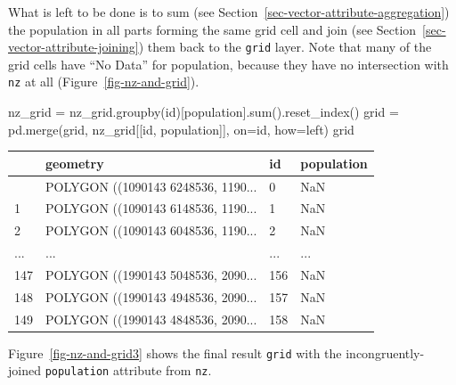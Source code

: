\documentclass[
  letterpaper,
]{krantz}
\newenvironment{Shaded}{\begin{snugshade}}{\end{snugshade}}
\newcommand{\BuiltInTok}[1]{\textcolor[rgb]{0.00,0.23,0.31}{#1}}
\newcommand{\NormalTok}[1]{\textcolor[rgb]{0.00,0.23,0.31}{#1}}
\newcommand{\OperatorTok}[1]{\textcolor[rgb]{0.37,0.37,0.37}{#1}}
\newcommand{\StringTok}[1]{\textcolor[rgb]{0.13,0.47,0.30}{#1}}
\begin{document}
What is left to be done is to sum (see
Section~\ref{sec-vector-attribute-aggregation}) the population in all
parts forming the same grid cell and join (see
Section~\ref{sec-vector-attribute-joining}) them back to the
\texttt{grid} layer. Note that many of the grid cells have ``No Data''
for population, because they have no intersection with \texttt{nz} at
all (Figure~\ref{fig-nz-and-grid}).

\begin{Shaded}
\begin{Highlighting}[]
\NormalTok{nz\_grid }\OperatorTok{=}\NormalTok{ nz\_grid.groupby(}\StringTok{\textquotesingle{}id\textquotesingle{}}\NormalTok{)[}\StringTok{\textquotesingle{}population\textquotesingle{}}\NormalTok{].}\BuiltInTok{sum}\NormalTok{().reset\_index()}
\NormalTok{grid }\OperatorTok{=}\NormalTok{ pd.merge(grid, nz\_grid[[}\StringTok{\textquotesingle{}id\textquotesingle{}}\NormalTok{, }\StringTok{\textquotesingle{}population\textquotesingle{}}\NormalTok{]], on}\OperatorTok{=}\StringTok{\textquotesingle{}id\textquotesingle{}}\NormalTok{, how}\OperatorTok{=}\StringTok{\textquotesingle{}left\textquotesingle{}}\NormalTok{)}
\NormalTok{grid}
\end{Highlighting}
\end{Shaded}

\begin{longtable}[]{@{}llll@{}}
\toprule\noalign{}
& geometry & id & population \\
\midrule\noalign{}
\endhead
\bottomrule\noalign{}
\endlastfoot
0 & POLYGON ((1090143 6248536, 1190... & 0 & NaN \\
1 & POLYGON ((1090143 6148536, 1190... & 1 & NaN \\
2 & POLYGON ((1090143 6048536, 1190... & 2 & NaN \\
... & ... & ... & ... \\
147 & POLYGON ((1990143 5048536, 2090... & 156 & NaN \\
148 & POLYGON ((1990143 4948536, 2090... & 157 & NaN \\
149 & POLYGON ((1990143 4848536, 2090... & 158 & NaN \\
\end{longtable}

Figure~\ref{fig-nz-and-grid3} shows the final result \texttt{grid} with
the incongruently-joined \texttt{population} attribute from \texttt{nz}.
\end{document}
